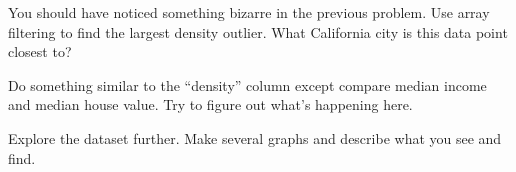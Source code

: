 \documentclass[11pt,letterpaper]{article}
\begin{document}
\begin{problem}
 You should have noticed something bizarre in the previous problem. Use array filtering to find 
the largest density outlier. What California city is this data point closest to?
\end{problem}



\begin{problem}
 Do something similar to the ``density'' column except compare median income and median house value.
Try to figure out what's happening here.
\end{problem}



\begin{problem}
Explore the dataset further. Make several graphs and describe what you see and find.
\end{problem}
\end{document}
